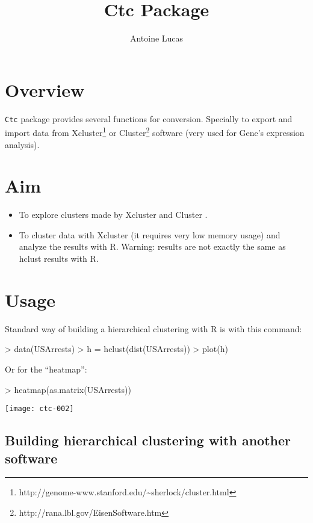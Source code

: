 \documentclass[a4paper]{article}
\title{Ctc Package}
\author{Antoine Lucas}
\begin{document}
\maketitle

\tableofcontents

\section{Overview}

{\tt Ctc} package provides several functions for 
conversion. Specially to export and import data from
Xcluster\footnote{http://genome-www.stanford.edu/\~\/sherlock/cluster.html} 
 or Cluster\footnote{http://rana.lbl.gov/EisenSoftware.htm} 
 software (very used for Gene's expression
analysis).

\section{Aim} 

\begin{itemize}
\item To explore clusters made by Xcluster and Cluster . 

\item To cluster data with Xcluster (it requires very low memory usage) 
and analyze the results with R. Warning: results are not exactly the same
as hclust results with R. 
\end{itemize}              
       
\section{Usage}

Standard way of building a hierarchical clustering with R
is with this command:
\begin{Schunk}
\begin{Sinput}
> data(USArrests)
> h = hclust(dist(USArrests))
> plot(h)
\end{Sinput}
\end{Schunk}
Or for the ``heatmap'':
\begin{Schunk}
\begin{Sinput}
> heatmap(as.matrix(USArrests))
\end{Sinput}
\end{Schunk}
\texttt{[image: ctc-002]}


\subsection{Building hierarchical clustering with another software}
\end{document}

